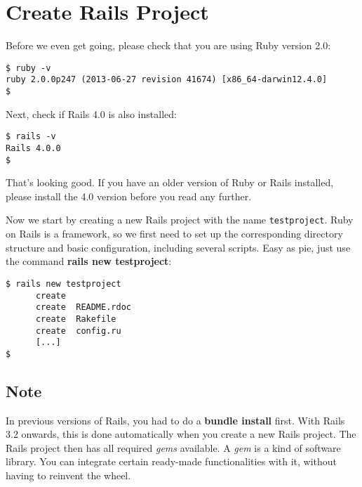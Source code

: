 \documentclass[a4paper]{book}
\begin{document}
\section{Create Rails Project}\label{create-rails-project}

Before we even get going, please check that you are using Ruby version 2.0:

\begin{shaded}\begin{verbatim}
$ ruby -v
ruby 2.0.0p247 (2013-06-27 revision 41674) [x86_64-darwin12.4.0]
$
\end{verbatim}\end{shaded}

Next, check if Rails 4.0 is also installed:

\begin{shaded}\begin{verbatim}
$ rails -v
Rails 4.0.0
$
\end{verbatim}\end{shaded}

That's looking good. If you have an older version of Ruby or Rails installed, please install the 4.0 version before you read any further.

Now we start by creating a new Rails project with the name \texttt{testproject}. Ruby on Rails is a framework, so we first need to set up the corresponding directory structure and basic configuration, including several scripts. Easy as pie, just use the command \textbf{rails new testproject}:

\begin{shaded}\begin{verbatim}
$ rails new testproject
      create  
      create  README.rdoc
      create  Rakefile
      create  config.ru
      [...]
$
\end{verbatim}\end{shaded}

\subsection{Note}\label{note-13}

In previous versions of Rails, you had to do a \textbf{bundle install} first. With Rails 3.2 onwards, this is done automatically when you create a new Rails project. The Rails project then has all required \emph{gems} available. A \emph{gem} is a kind of software library. You can integrate certain ready-made functionalities with it, without having to reinvent the wheel.
\end{document}
